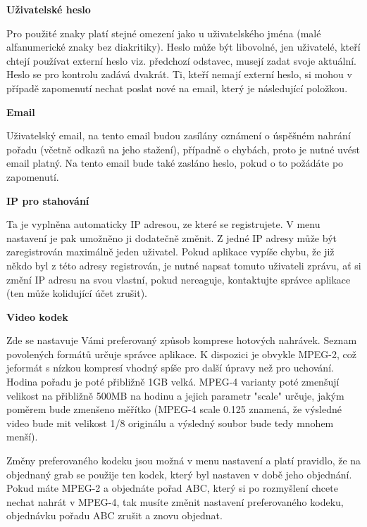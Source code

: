\textbf{Uživatelské heslo}

Pro použité znaky platí stejné omezení jako u uživatelského jména (malé alfanumerické znaky bez diakritiky). Heslo může být libovolné, jen uživatelé, kteří chtejí používat externí heslo viz. předchozí odstavec, musejí zadat svoje aktuální. Heslo se pro kontrolu zadává dvakrát. Ti, kteří nemají externí heslo, si mohou v případě zapomenutí nechat poslat nové na email, který je následující položkou.

\vspace{10pt}

\textbf{Email}

Uživatelský email, na tento email budou zasílány oznámení o úspěšném nahrání pořadu (včetně odkazů na jeho stažení), případně o chybách, proto je nutné uvést email platný. Na tento email bude také zasláno heslo, pokud o to požádáte po zapomenutí.

\vspace{10pt}

\textbf{IP pro stahování}

Ta je vyplněna automaticky IP adresou, ze které se registrujete. V menu nastavení je pak umožněno ji dodatečně změnit. Z jedné IP adresy může být zaregistrován maximálně jeden uživatel. Pokud aplikace vypíše chybu, že již někdo byl z této adresy registrován, je nutné napsat tomuto uživateli zprávu, ať si změní IP adresu na svou vlastní, pokud nereaguje, kontaktujte správce aplikace (ten může kolidující účet zrušit).

\vspace{10pt}

\textbf{Video kodek}

Zde se nastavuje Vámi preferovaný způsob komprese hotových nahrávek. Seznam povolených formátů určuje správce aplikace. K dispozici je obvykle MPEG-2, což jeformát s nízkou kompresí vhodný spíše pro další úpravy než pro uchování. Hodina pořadu je poté přibližně 1GB velká. MPEG-4 varianty poté zmenšují velikost na přibližně 500MB na hodinu a jejich parametr "scale" určuje, jakým poměrem bude zmenšeno měřítko (MPEG-4 scale 0.125 znamená, že výsledné video bude mit velikost 1/8 originálu a výsledný soubor bude tedy mnohem menší).

\vspace{10pt}

Změny preferovaného kodeku jsou možná v menu nastavení a platí pravidlo, že na objednaný grab se použije ten kodek, který byl nastaven v době jeho objednání. Pokud máte MPEG-2 a objednáte pořad ABC, který si po rozmyšlení chcete nechat nahrát v MPEG-4, tak musíte změnit nastavení preferovaného kodeku, objednávku pořadu ABC zrušit a znovu objednat.

